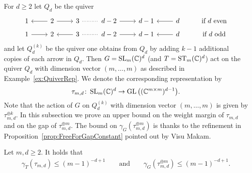 For $d \geq 2$ let $Q_d$ be the quiver
\[ \begin{tikzcd}[row sep = tiny]
	1 \ar[r, leftarrow] & 2 \ar[r, rightarrow] & 3 \ar[r, dotted, no head ,thick] & d-2 \ar[r, rightarrow] & d-1 \ar[r, leftarrow] & d & \text{if } d \text{ even} \\
	1 \ar[r, rightarrow] & 2 \ar[r, leftarrow] & 3 \ar[r, dotted, no head ,thick] & d-2 \ar[r, rightarrow] & d-1 \ar[r, leftarrow] & d & \text{if } d \text{ odd}
\end{tikzcd} \]
and let $Q_{d}^{(k)}$ be the quiver one obtains from $Q_d$ by adding $k-1$ additional copies of each arrow in $Q_d$.
Then $G = \operatorname{SL}_{m}(\mathbb C)^d$ (and $T = \operatorname{ST}_{m}(\mathbb C)^d$)  act on the quiver $Q_d$ with dimension vector $(m, \ldots, m)$ as described in Example~\ref{ex:QuiverRep}.
We denote the corresponding representation by
	\[ \tau_{m,d} \colon \operatorname{SL}_{m}(\mathbb C)^d \to \operatorname{GL} \big( (\mathbb C^{m \times m} )^{d-1} \big) . \]
Note that the action of $G$ on $Q_d^{(k)}$ with dimension vector $(m, \ldots, m)$ is given by $\tau_{m,d}^{\oplus k}$.  In this subsection we prove an upper bound on the weight margin of $\tau_{m,d}$ and on the gap of $\tau_{m,d}^{\oplus m}$. The bound on $\gamma_{G}(\tau_{m,d}^{\oplus m})$ is thanks to the refinement in Proposition~\ref{prop:FreeForGapConstant} pointed out by Visu Makam. %

\begin{theorem} \label{thm:UpperBoundQuiver}
	Let $m, d \geq 2$. It holds that
	\begin{align*}
		\gamma_{T}(\tau_{m,d}) \leq (m-1)^{-d+1} \qquad \text{and} \qquad \gamma_{G}(\tau_{m,d}^{\oplus m}) \leq (m-1)^{-d+1}.
	\end{align*}
\end{theorem}

